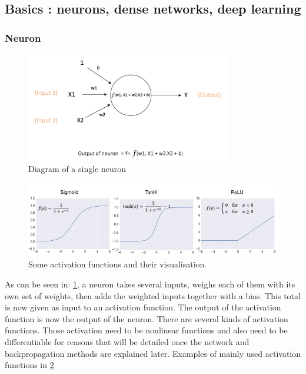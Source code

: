 \subsection{Basics : neurons, dense networks, deep learning}

\subsubsection{Neuron}

\begin{figure}
    \centering
    \includegraphics[width=0.8\textwidth]{Images/neuron_diagram}
    \caption{Diagram of a single neuron}
    \label{fig:neuron_diagram}
\end{figure}


\begin{figure}
    \centering
    \includegraphics[width=\textwidth]{Images/activation_functions.png}
    \caption{Some activation functions and their visualisation.}
    \label{fig:activation_functions}
\end{figure}

As can be seen in: \ref{fig:neuron_diagram}, a neuron takes several inputs, weighs each of them with its own set of weights, then adds the weighted inputs together with a bias.
This total is now given as input to an activation function. 
The output of the activation function is now the output of the neuron.
There are several kinds of activation functions. Those activation need to be nonlinear functions and also need to be differentiable for reasons that will be detailed once the network and backpropagation methods are explained later.
Examples of mainly used activation functions in \ref{fig:activation_functions}


